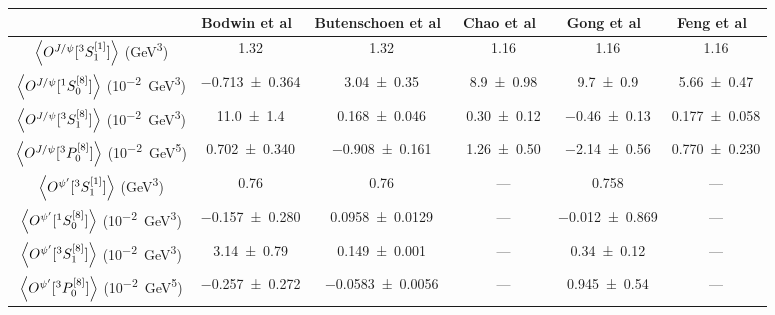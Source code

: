 \begin{tabular}{c|ccccc}
	\hline
	                                                            & Bodwin et al~\cite{bodwin2016} & Butenschoen et al~\cite{butenschoen2011,butenschoen2023} & Chao et al~\cite{chao2012} & Gong et al~\cite{gong2013} & Feng et al~\cite{feng2019} \\ \hline
	$\expval{ O^{J/\psi}[^3S_1^{\left[1\right]}]}$ (\unit{\GeV^3})        & \num{1.32}                     & \num{1.32}                                               & \num{1.16}                 & \num{1.16}                 & \num{1.16}                 \\ \hline
	$\expval{ O^{J/\psi}[^1S_0^{\left[8\right]}]}$ (\unit{10^{-2}\GeV^3}) & \num{-0.713\pm0.364}           & \num{3.04\pm0.35}                                        & \num{8.9\pm0.98}           & \num{9.7\pm0.9}            & \num{5.66\pm0.47}          \\ \hline
	$\expval{ O^{J/\psi}[^3S_1^{\left[8\right]}]}$ (\unit{10^{-2}\GeV^3}) & \num{11.0\pm1.4}               & \num{0.168\pm0.046}                                      & \num{0.30\pm0.12}          & \num{-0.46\pm0.13}         & \num{0.177\pm0.058}        \\ \hline
	$\expval{ O^{J/\psi}[^3P_0^{\left[8\right]}]}$ (\unit{10^{-2}\GeV^5}) & \num{0.702\pm0.340}            & \num{-0.908\pm0.161}                                     & \num{1.26\pm0.50}          & \num{-2.14\pm0.56}         & \num{0.770\pm0.230}        \\ \hline \hline
	$\expval{ O^{\psi'}[^3S_1^{\left[1\right]}]}$ (\unit{\GeV^3})         & \num{0.76}                     & \num{0.76}                                               & ---                        & \num{0.758}                & ---                        \\ \hline
	$\expval{ O^{\psi'}[^1S_0^{\left[8\right]}]}$ (\unit{10^{-2}\GeV^3})  & \num{-0.157\pm0.280}           & \num{0.0958\pm0.0129}                                    & ---                        & \num{-0.012\pm0.869}       & ---                        \\ \hline
	$\expval{ O^{\psi'}[^3S_1^{\left[8\right]}]}$ (\unit{10^{-2}\GeV^3})  & \num{3.14\pm0.79}              & \num{0.149\pm0.001}                                      & ---                        & \num{0.34\pm0.12}          & ---                        \\ \hline
	$\expval{ O^{\psi'}[^3P_0^{\left[8\right]}]}$ (\unit{10^{-2}\GeV^5})  & \num{-0.257\pm0.272}           & \num{-0.0583\pm0.0056}                                   & ---                        & \num{0.945\pm0.54}         & ---                        \\ \hline
\end{tabular}